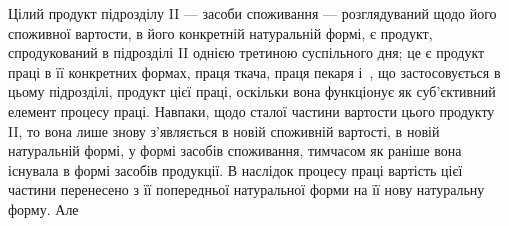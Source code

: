 Цілий продукт підрозділу II — засоби споживання — розглядуваний щодо
його споживної вартости, в його конкретній натуральній формі, є продукт,
спродукований в підрозділі II однією третиною суспільного дня;
це є продукт праці в її конкретних формах, праця ткача, праця пекаря
і~, що застосовується в цьому підрозділі, продукт цієї праці, оскільки
вона функціонує як суб’єктивний елемент процесу праці. Навпаки,
щодо сталої частини вартости цього продукту II, то вона лише знову
з’являється в новій споживній вартості, в новій натуральній формі, у
формі засобів споживання, тимчасом як раніше вона існувала в формі засобів
продукції. В наслідок процесу праці вартість цієї частини перенесено
з її попередньої натуральної форми на її нову натуральну форму. Але
\parbreak{}  %
